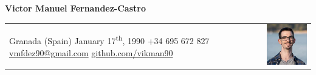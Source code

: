 \documentclass[12pt,a4paper]{article}
\begin{document}
	\sffamily
	\large

	\begin{center}
		\textbf{Victor Manuel Fernandez-Castro}
	\end{center}

	\normalsize
	\centering

	\begin{tabular}{m{}m{}}
		Granada (Spain) \newline
		January 17\textsuperscript{th}, 1990 \newline
		\newline
		+34 695 672 827 \newline
		\href{mailto:vmfdez90@gmail.com}{vmfdez90@gmail.com} \newline
		\href{https://github.com/vikman90}{github.com/vikman90} &
		\includegraphics[width=3cm]{victor}
	\end{tabular}

	\medskip

\end{document}
